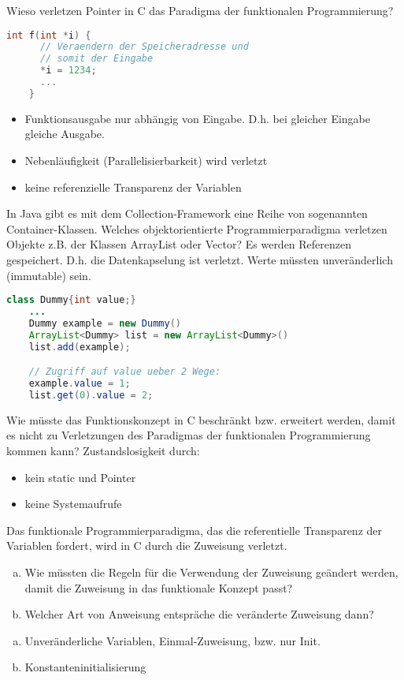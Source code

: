 \begin{card}
	Wieso verletzen Pointer in C das Paradigma der funktionalen Programmierung?
	\hr
	\begin{lstlisting}[language=C]
	int f(int *i) {
	  // Veraendern der Speicheradresse und
	  // somit der Eingabe
	  *i = 1234;
	  ...
	}
	\end{lstlisting}
  \begin{itemize}
    \item Funktionsausgabe nur abhängig von Eingabe.  D.h. bei gleicher Eingabe gleiche Ausgabe.
    \item Nebenläufigkeit (Parallelisierbarkeit) wird verletzt
    \item keine referenzielle Transparenz der Variablen
  \end{itemize}
\end{card}

\begin{card}
	In Java gibt es mit dem Collection-Framework eine Reihe von sogenannten Container-Klassen. Welches objektorientierte Programmierparadigma verletzen Objekte z.B. der Klassen	ArrayList oder Vector?
	\hr
	Es werden Referenzen gespeichert. D.h. die Datenkapselung ist verletzt. Werte müssten unveränderlich (immutable) sein.
	\begin{lstlisting}[language=Java]
	class Dummy{int value;}
	...
	Dummy example = new Dummy()
	ArrayList<Dummy> list = new ArrayList<Dummy>()
	list.add(example);

	// Zugriff auf value ueber 2 Wege:
	example.value = 1;
	list.get(0).value = 2;
	\end{lstlisting}
\end{card}

\begin{card}
	Wie müsste das Funktionskonzept in C beschränkt bzw. erweitert werden, damit es nicht zu Verletzungen des Paradigmas der funktionalen Programmierung kommen kann?
	\hr
	Zustandslosigkeit durch:
	\begin{itemize}
	\item kein static und Pointer
	\item keine Systemaufrufe
	\end{itemize}
\end{card}

\begin{card}
	Das funktionale Programmierparadigma, das die referentielle Transparenz der Variablen fordert, wird in C durch die Zuweisung verletzt.
	\begin{enumerate}[a)]
	\item Wie müssten die Regeln für die Verwendung der Zuweisung geändert werden, damit die	Zuweisung in das funktionale Konzept passt?
	\item Welcher Art von Anweisung entspräche die veränderte Zuweisung dann?
	\end{enumerate}
	\hr
	\begin{enumerate}[a)]
	\item Unveränderliche Variablen, Einmal-Zuweisung, bzw. nur Init.
	\item Konstanteninitialisierung
	\end{enumerate}

\end{card}


